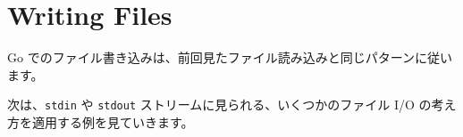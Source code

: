 \section{Writing Files}

Go でのファイル書き込みは、前回見たファイル読み込みと同じパターンに従います。




次は、\texttt{stdin} や \texttt{stdout} ストリームに見られる、いくつかのファイル I/O の考え方を適用する例を見ていきます。